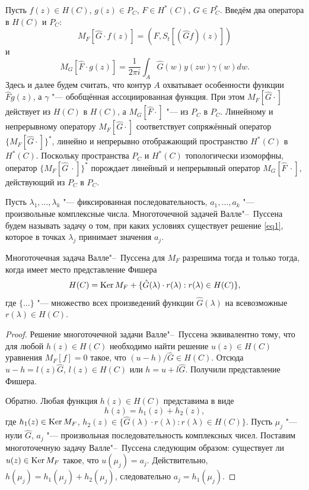 Пусть $f(z)\in H(C)$, $g(z)\in P_C$, $F\in H^*(C)$, $G\in P^*_C$. 
Введём два оператора в $H(C)$ и $P_C$: $$M_F[\hat G \cdot f(z)]=(F,S_t[(\hat G f)(z)])$$ и $$M_G[\hat F\cdot g(z)]=\frac1{2\pi i}\int_A {\hat G(w)y(zw)\gamma (w)dw}.$$ 
Здесь и далее будем считать, что контур $A$ охватывает особенности функции $\hat F  g(z)$, а $\gamma$ "--- обобщённая ассоциированная функция. 
При этом $M_F[\hat G\cdot]$ действует из $H(C)$ в $H(C)$, а $M_G[\hat F\cdot]$ "--- из $P_C$ в $P_C$. Линейному и непрерывному оператору $M_F[\hat G\cdot]$ соответствует сопряжённый оператор $\{M_F[\hat G\cdot]\}^*$, линейно и непрерывно отображающий пространство $H^*(C)$ в $H^*(C)$. Поскольку пространства $P_C$ и $H^*(C)$ топологически изоморфны, оператор $\{M_F[\hat G~\cdot]\}^*$ порождает линейный и непрерывный оператор $M_G[\hat F~\cdot]$, действующий из $P_C$ в $P_C$. 

Пусть $\lambda_1, \dots, \lambda_k$ "--- фиксированная последовательность, $a_1, \dots, a_k$ "--- произвольные комплексные числа. 
Многоточечной задачей Валле"--~Пуссена будем называть  задачу о том, при каких условиях существует решение \eqref{eq1}, которое в точках $\lambda_j$ принимает значения $a_j$.  

\smallskip

\begin{theorem}[6]Многоточечная задача Валле"--~Пуссена для $M_F$ разрешима тогда и только тогда{\rm ,} когда имеет место представление Фишера {\rm \cite{zabirova7}}
\begin{equation} \label{eq3}
H(C)=\mathop{\rm Ker} M_F+\{\hat G(\lambda)\cdot r(\lambda):r(\lambda)\in H(C)\},
\end{equation}
где $\{ \dots \}$ "--- множество всех произведений функции $\hat G(\lambda)$ на всевозможные $r(\lambda)\in H(C).$
\end{theorem}

\smallskip

\begin{proof} Решение многоточечной задачи Валле"--~Пуссена эквивалентно тому, что для любой $h(z)\in H(C)$ необходимо найти решение $u(z)\in H(C)$ уравнения $M_F[f]=0$ такое, что $( {u-h})/{\hat G}\in H(C)$. 
Отсюда $u-h=l(z)\hat G$, $l(z)\in H(C)$ или $h=u+l\hat G$. 
Получили представление Фишера.

Обратно. Любая функция $h(z)\in H(C)$ представима в виде $$h(z)=h_1(z)+h_2(z),$$ 
где $h_1(z)\in \mathop{\rm Ker} M_F$, $h_2(z)\in \{\hat G(\lambda)\cdot r(\lambda):r(\lambda)\in H(C)\}.$ 
Пусть $\mu_j$ "--- нули $\hat G$, $a_j$ "--- произвольная последовательность комплексных чисел. Поставим многоточечную задачу Валле"--~Пуссена следующим образом: существует ли 
$u(z)\in \mathop{\rm Ker}M_F$ такое, что $u(\mu_j)=a_j$. Действительно, $h(\mu_j)=h_1(\mu_j)+h_2(\mu_j)$, следовательно $a_j=h_1(\mu_j)$. 
\end{proof}

